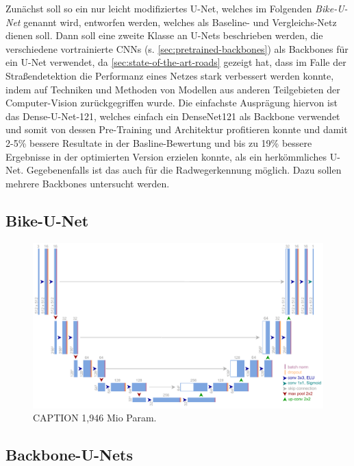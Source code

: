 Zunächst soll so ein nur leicht modifiziertes U-Net, welches im Folgenden \textit{Bike-U-Net} 
genannt wird, entworfen werden, welches als Baseline- und Vergleichs-Netz dienen soll.
Dann soll eine zweite Klasse an U-Nets beschrieben werden, die verschiedene vortrainierte \acp{CNN} (s. \autoref{sec:pretrained-backbones}) 
als Backbones für ein U-Net verwendet, da \autoref{sec:state-of-the-art-roads} gezeigt hat, 
dass im Falle der Straßendetektion die Performanz eines Netzes stark verbessert werden konnte, 
indem auf Techniken und Methoden von Modellen aus anderen Teilgebieten der Computer-Vision 
zurückgegriffen wurde. Die einfachste Ausprägung hiervon ist das Dense-U-Net-121, 
welches einfach ein DenseNet121 als Backbone verwendet und somit von dessen Pre-Training und Architektur
profitieren konnte und damit 2-5\% bessere Resultate in der Basline-Bewertung und bis zu 19\% 
bessere Ergebnisse in der optimierten Version erzielen konnte, als ein herkömmliches U-Net. 
Gegebenenfalls ist das auch für die Radwegerkennung möglich. Dazu sollen mehrere Backbones untersucht werden. 

\subsection{Bike-U-Net}

\begin{figure}
	\centering
	\includegraphics[width=1.\textwidth]{Bilder/own-unet-2mil.pdf} 
	\caption{CAPTION 1,946 Mio Param.}
	\label{fig:own-unet-2mil}
\end{figure} 


\subsection{Backbone-U-Nets}



